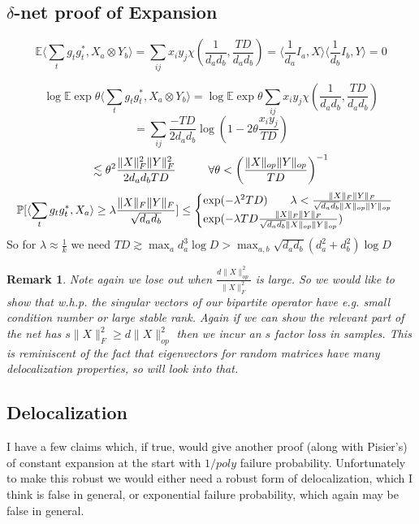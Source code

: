\documentclass{article}
\newtheorem{remark}{Remark}
\newcommand{\E}{\mathbb{E}}
\renewcommand{\Pr}{\mathbb{P}}
\begin{document}
\subsection{$\delta$-net proof of Expansion}
\[ \E \langle \sum_{t} g_{t} g_{t}^{*}, X_{a} \otimes Y_{b} \rangle = \sum_{ij} x_{i} y_{j} \chi(\frac{1}{d_{a} d_{b}}, \frac{TD}{d_{a} d_{b}}) = \langle \frac{1}{d_{a}} I_{a}, X \rangle \langle \frac{1}{d_{b}} I_{b}, Y \rangle = 0 \]

\[ \log \E \exp \theta \langle \sum_{t} g_{t} g_{t}^{*}, X_{a} \otimes Y_{b} \rangle = \log \E \exp \theta \sum_{ij} x_{i} y_{j} \chi(\frac{1}{d_{a} d_{b}}, \frac{TD}{d_{a} d_{b}})  \]
\[ = \sum_{ij} \frac{-TD}{2 d_{a} d_{b}} \log \left( 1 - 2 \theta \frac{x_{i} y_{j}}{TD} \right)   \]
\[ \lesssim \theta^{2} \frac{\|X\|_{F}^{2} \|Y\|_{F}^{2}}{2 d_{a} d_{b} TD} \hspace{10mm} \forall \theta < \left( \frac{\|X\|_{op} \|Y\|_{op}}{TD} \right)^{-1}  \]
\[ \Pr[ \langle \sum_{t} g_{t} g_{t}^{*}, X_{a} \rangle \geq \lambda \frac{\|X\|_{F} \|Y\|_{F}}{\sqrt{d_{a} d_{b}}} ] \leq 
\begin{cases} 
\exp( - \lambda^{2} TD ) \hspace{7mm} \lambda  < \frac{\|X\|_{F} \|Y\|_{F}}{\sqrt{d_{a} d_{b}} \|X\|_{op} \|Y\|_{op}} 
\\ \exp ( - \lambda TD \frac{\|X\|_{F} \|Y\|_{F}}{ \sqrt{d_{a} d_{b}} \|X\|_{op} \|Y\|_{op}} )
\end{cases}
\]
So for $\lambda \approx \frac{1}{k}$ we need $TD \gtrsim \max_{a} d_{a}^{3} \log D > \max_{a,b} \sqrt{d_{a} d_{b}} (d_{a}^{2} + d_{b}^{2}) \log D$

\begin{remark}
Note again we lose out when $\frac{d \|X\|_{op}^{2}}{\|X\|_{F}^{2}}$ is large. So we would like to show that w.h.p. the singular vectors of our bipartite operator have e.g. small condition number or large stable rank. Again if we can show the relevant part of the net has $s \|X\|_{F}^{2} \geq d \|X\|_{op}^{2}$ then we incur an $s$ factor loss in samples. This is reminiscent of the fact that eigenvectors for random matrices have many delocalization properties, so will look into that. 
\end{remark}

\subsection{Delocalization}
I have a few claims which, if true, would give another proof (along with Pisier's) of constant expansion at the start with $1/poly$ failure probability. Unfortunately to make this robust we would either need a robust form of delocalization, which I think is false in general, or exponential failure probability, which again may be false in general.
\end{document}
